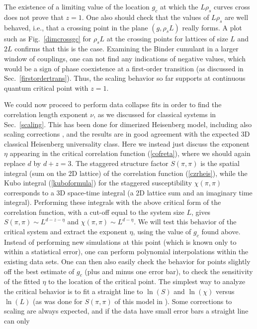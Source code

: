 \documentclass[draft,numberedheadings]{aipproc}
\begin{document}
The existence of a limiting value of the location $g_c$ at which the $L\rho_s$ curves cross does not prove that $z=1$. One also should check that the values 
of $L\rho_s$ are well behaved, i.e., that a crossing point in the plane $(g,\rho_sL)$ really forms. A plot such as Fig.~\ref{dimcrossgc} for $\rho_sL$ at the 
crossing points for lattices of size $L$ and $2L$ confirms that this is the case. Examining the Binder cumulant in a larger window of couplings, one can not 
find any indications of negative values, which would be a sign of phase coexistence at a first-order transition (as discussed in Sec.~\ref{firstordertrans}). 
Thus, the scaling behavior so far supports at continuous quantum critical point with $z=1$.

We could now proceed to perform data collapse fits in order to find the correlation length exponent $\nu$, as we discussed for classical systems in
Sec.~\ref{scaling}. This has been done for dimerized Heisenberg model, including also scaling corrections \cite{wang,wenzel1}, and the results are in
good agreement with the expected 3D classical Heisenberg universality class. Here we instead just discuss the exponent $\eta$ appearing in the critical 
correlation function (\ref{cofreta}), where we should again replace $d$ by $d+z=3$. The staggered structure factor $S(\pi,\pi)$ is the spatial integral 
(sum on the 2D lattice) of the correlation function (\ref{czrheis}), while the Kubo integral (\ref{kuboformula}) for the staggered susceptibility $\chi(\pi,\pi)$ 
corresponds to a 3D space-time integral (a 2D lattice sum and an imaginary time integral). Performing these integrals with the above critical form of the 
correlation function, with a cut-off equal to the system size $L$, gives $S(\pi,\pi) \sim L^{d-z-\eta}$ and $\chi(\pi,\pi) \sim L^{d-\eta}$. We will test this 
behavior of the critical system and extract the exponent $\eta$, using the value of $g_c$ found above. Instead of performing new simulations at this point 
(which is known only to within a statistical error), one can perform polynomial interpolations within the existing data sets. One can then also easily check 
the behavior for points slightly off the best estimate of $g_c$ (plus and minus one error bar), to check the sensitivity of the fitted $\eta$ to the location 
of the critical point. The simplest way to analyze the critical behavior is to fit a straight line to $\ln(S)$ and $\ln(\chi)$ versus $\ln(L)$ (as was done for 
$S(\pi,\pi)$ of this model in \cite{wenzel1}). Some corrections to scaling are always expected, and if the data have small error bars a straight line can only 
\end{document}
